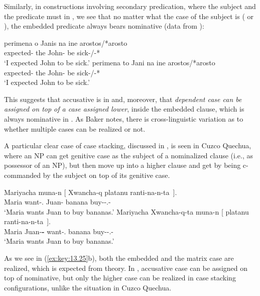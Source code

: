 \documentclass[output=paper]{langsci/langscibook}
\begin{document}
Similarly, in constructions involving secondary predication, where the subject
and the predicate must  in , we see that no matter what the case of
the subject is (\Nom{} or \Acc), the embedded predicate always bears nominative
(data from \citealt{KotzPapa2007}):

\ea%
\label{ex:key:13.24} \parencite{KotzPapa2007}
	\ea
	\gll  perimena o Janis na ine arostos/*arosto\\
	    expected-\Fsg{} the John-\Nom{} \Sbjv{} be sick-\Nom{}/-*\Acc{}\\
	\glt     ‘I expected John to be sick.’
	\ex
	\gll  perimena to Jani na ine arostos/*arosto\\
	    expected-\Fsg{} the John-\Acc{} \Sbjv{} be sick-\Nom{}/-*\Acc{}\\
	\glt     ‘I expected John to be sick.’
    \z
\z

This suggests that accusative is  in  and, moreover, that
\emph{dependent case can be assigned on top of a case assigned lower}, inside
the embedded clause, which is always nominative in .  As Baker notes,
there is cross-linguistic variation as to whether multiple cases can be
realized or not.

A particular clear case of case stacking, discussed in \citet{Baker2015}, is
seen in Cuzco Quechua, where an NP can get genitive case as the subject of a
nominalized clause (i.e., as possessor of an NP), but then move up into a
higher clause and get  by being c-commanded by the subject on
top of its genitive case.

\ea%
\label{ex:key:13.25} \parencite[116]{Baker2015}
	\ea
	\gll  Mariyacha muna-n  [ Xwancha-q platanu ranti-na-n-ta~].\\
        Maria want-\Third.\Sbj{} {} Juan-\textbf{\Gen{}}  banana buy-\Nmlz{}-\Third.\Poss{}-\Acc{}\\
	\glt     ‘Maria wants Juan to buy bananas.’
	\ex
	\gll  Mariyacha  Xwancha-q-ta muna-n [ platanu ranti-na-n-ta~].\\
        Maria    Juan-\textbf{\Gen{}-\Acc{}} want-\Third.\Sbj{} {} banana buy-\Nmlz{}-\Third.\Poss{}-\Acc{}\\
	\glt     ‘Maria wants Juan to buy bananas.’
    \z
\z

As we see in (\ref{ex:key:13.25}b), both the embedded and the matrix case are
realized, which is expected from  theory. In ,
accusative case can be assigned on top of nominative, but
only the higher case can be realized in case stacking configurations, unlike
the situation in Cuzco Quechua.
\end{document}
